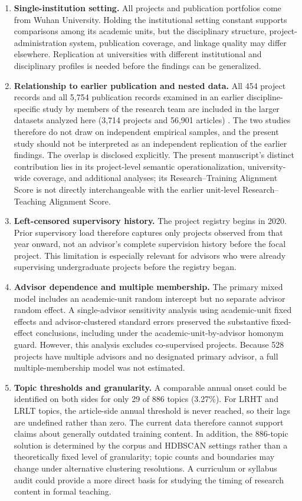 \documentclass[pdflatex,sn-apa]{sn-jnl}
\begin{document}
\begin{enumerate}
\item \textbf{Single-institution setting.} All projects and publication portfolios come from Wuhan University. Holding the institutional setting constant supports comparisons among its academic units, but the disciplinary structure, project-administration system, publication coverage, and linkage quality may differ elsewhere. Replication at universities with different institutional and disciplinary profiles is needed before the findings can be generalized.

\item \textbf{Relationship to earlier publication and nested data.} All 454 project records and all 5,754 publication records examined in an earlier discipline-specific study by members of the research team are included in the larger datasets analyzed here (3,714 projects and 56,901 articles) \citep{tian2026surveying}. The two studies therefore do not draw on independent empirical samples, and the present study should not be interpreted as an independent replication of the earlier findings. The overlap is disclosed explicitly. The present manuscript's distinct contribution lies in its project-level semantic operationalization, university-wide coverage, and additional analyses; its Research--Training Alignment Score is not directly interchangeable with the earlier unit-level Research--Teaching Alignment Score.

\item \textbf{Left-censored supervisory history.} The project registry begins in 2020. Prior supervisory load therefore captures only projects observed from that year onward, not an advisor's complete supervision history before the focal project. This limitation is especially relevant for advisors who were already supervising undergraduate projects before the registry began.

\item \textbf{Advisor dependence and multiple membership.} The primary mixed model includes an academic-unit random intercept but no separate advisor random effect. A single-advisor sensitivity analysis using academic-unit fixed effects and advisor-clustered standard errors preserved the substantive fixed-effect conclusions, including under the academic-unit-by-advisor homonym guard. However, this analysis excludes co-supervised projects. Because 528 projects have multiple advisors and no designated primary advisor, a full multiple-membership model was not estimated.

\item \textbf{Topic thresholds and granularity.} A comparable annual onset could be identified on both sides for only 29 of 886 topics (3.27\%). For LRHT and LRLT topics, the article-side annual threshold is never reached, so their lags are undefined rather than zero. The current data therefore cannot support claims about generally outdated training content. In addition, the 886-topic solution is determined by the corpus and HDBSCAN settings rather than a theoretically fixed level of granularity; topic counts and boundaries may change under alternative clustering resolutions. A curriculum or syllabus audit could provide a more direct basis for studying the timing of research content in formal teaching.


\end{enumerate}
\end{document}
